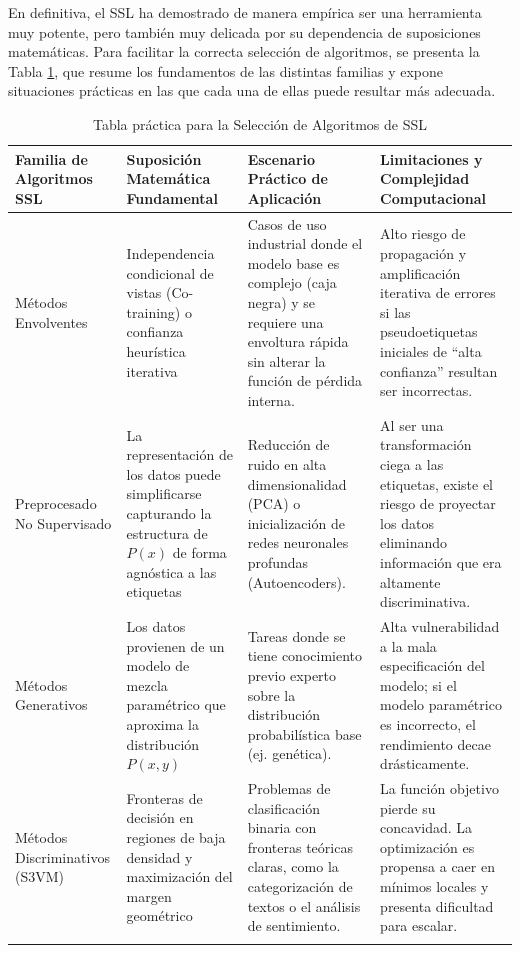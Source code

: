 En definitiva, el \gls{SSL} ha demostrado de manera empírica ser una herramienta muy potente, pero también muy delicada por su dependencia de suposiciones matemáticas. Para facilitar la correcta selección de algoritmos, se presenta la Tabla \ref{tab:matriz_decision_ssl}, que resume los fundamentos de las distintas familias y expone situaciones prácticas en las que cada una de ellas puede resultar más adecuada.

\begin{table}[ht]
\centering
\small
\caption{Tabla práctica para la Selección de Algoritmos de \gls{SSL}}
\label{tab:matriz_decision_ssl}
\renewcommand{\arraystretch}{1.3} 
\begin{tabular}{
  >{\raggedright\arraybackslash}p{3cm} 
  >{\raggedright\arraybackslash}p{4cm} 
  >{\raggedright\arraybackslash}p{4cm} 
  >{\raggedright\arraybackslash}p{4cm}
}
\toprule
\textbf{Familia de Algoritmos SSL} & \textbf{Suposición Matemática Fundamental} & \textbf{Escenario Práctico de Aplicación} & \textbf{Limitaciones y Complejidad Computacional} \\
\midrule
Métodos Envolventes & Independencia condicional de vistas (Co-training) o confianza heurística iterativa & Casos de uso industrial donde el modelo base es complejo (caja negra) y se requiere una envoltura rápida sin alterar la función de pérdida interna. & Alto riesgo de propagación y amplificación iterativa de errores si las pseudoetiquetas iniciales de ``alta confianza'' resultan ser incorrectas. \\ 
\addlinespace

Preprocesado No Supervisado & La representación de los datos puede simplificarse capturando la estructura de $P(x)$ de forma agnóstica a las etiquetas & Reducción de ruido en alta dimensionalidad (PCA) o inicialización de redes neuronales profundas (Autoencoders). & Al ser una transformación ciega a las etiquetas, existe el riesgo de proyectar los datos eliminando información que era altamente discriminativa. \\ 
\addlinespace

Métodos Generativos & Los datos provienen de un modelo de mezcla paramétrico que aproxima la distribución $P(x,y)$ & Tareas donde se tiene conocimiento previo experto sobre la distribución probabilística base (ej. genética). & Alta vulnerabilidad a la mala especificación del modelo; si el modelo paramétrico es incorrecto, el rendimiento decae drásticamente. \\ 
\addlinespace

Métodos Discriminativos (S3VM) & Fronteras de decisión en regiones de baja densidad y maximización del margen geométrico & Problemas de clasificación binaria con fronteras teóricas claras, como la categorización de textos o el análisis de sentimiento. & La función objetivo pierde su concavidad. La optimización es propensa a caer en mínimos locales y presenta dificultad para escalar. \\ 
\addlinespace


\end{tabular}
\end{table}
